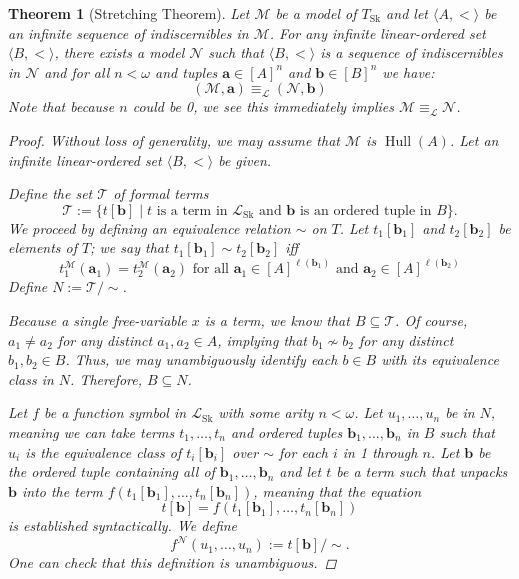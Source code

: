 \documentclass{amsart}
\newtheorem{theorem}{Theorem}[section]
\theoremstyle{definition}
\numberwithin{equation}{theorem}
\newcommand{\V}{\mathbf}
\newcommand{\where}{\mid}
\newcommand{\len}{\ell}
\newcommand{\Tskolem}{{T_{\operatorname{Sk}}}}
\newcommand{\frag}{\mathcal{L}}
\newcommand{\fragsk}{\frag_{\operatorname{Sk}}}
\newcommand{\hull}{\operatorname{Hull}}
\begin{document}
\begin{theorem}[Stretching Theorem]\label{thm:stretching}
  Let $\mathcal M$ be a model of $\Tskolem$ and let $\langle A,<\rangle$ be an infinite sequence of indiscernibles in $\mathcal M$.
  For any infinite linear-ordered set $\langle B,<\rangle$, there exists a model $\mathcal N$ such that $\langle B,<\rangle$ is a sequence of indiscernibles in $\mathcal N$ and for all $n<\omega$ and tuples $\V a\in[A]^n$ and $\V b\in[B]^n$ we have:
  \[
    (\mathcal M,\V a)\equiv_\frag (\mathcal N,\V b)
  \]
  Note that because $n$ could be 0, we see this immediately implies $\mathcal M\equiv_\frag\mathcal N$.
  \begin{proof}
    Without loss of generality, we may assume that $\mathcal M$ is $\hull(A)$.
    Let an infinite linear-ordered set $\langle B,<\rangle$ be given.
    
    Define the set $\mathcal T$ of formal terms
    \[
      \mathcal T:=\{t[\V b]\where \text{$t$ is a term in $\fragsk$ and $\V b$ is an ordered tuple in $B$}\}.
    \]
    We proceed by defining an equivalence relation $\sim$ on $T$.
    Let $t_1[\V b_1]$ and $t_2[\V b_2]$ be elements of $T$; we say that $t_1[\V b_1]\sim t_2[\V b_2]$ iff 
    \[
      t_1^\mathcal M(\V a_1)=t_2^\mathcal M(\V a_2)\text{ for all $\V a_1\in[A]^{\len(\V b_1)}$ and $\V a_2\in[A]^{\len(\V b_2)}$}
    \]
    Define $N:=\mathcal T/{\sim}$.
    
    Because a single free-variable $x$ is a term, we know that $B\subseteq \mathcal T$.
    Of course, $a_1\neq a_2$ for any distinct $a_1,a_2\in A$, implying that $b_1\not\sim b_2$ for any distinct $b_1,b_2\in B$.
    Thus, we may unambiguously identify each $b\in B$ with its equivalence class in $N$.
    Therefore, $B\subseteq N$.
    
    Let $f$ be a function symbol in $\fragsk$ with some arity $n<\omega$.
    Let $u_1,\dots,u_n$ be in $N$, meaning we can take terms $t_1,\dots,t_n$ and ordered tuples $\V b_1,\dots,\V b_n$ in $B$ such that $u_i$ is the equivalence class of $t_i[\V b_i]$ over $\sim$ for each $i$ in 1 through $n$.
    Let $\V b$ be the ordered tuple containing all of $\V b_1,\dots,\V b_n$ and let $t$ be a term such that unpacks $\V b$ into the term $f(t_1[\V b_1],\dots,t_n[\V b_n])$, meaning that the equation
    \[
      t[\V b]=f(t_1[\V b_1],\dots,t_n[\V b_n])
    \]
    is established syntactically.
    We define
    \[
      f^\mathcal N(u_1,\dots, u_n):=t[\V b]/{\sim}.
    \]
    One can check that this definition is unambiguous.
    

\end{proof}
\end{theorem}
\end{document}
